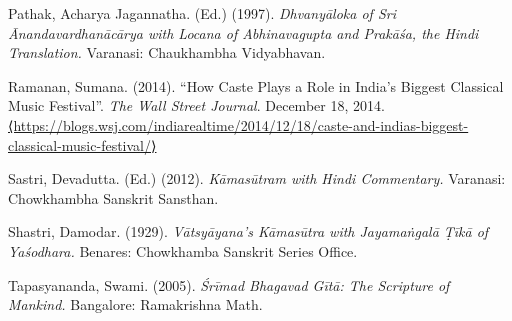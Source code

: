 \begin{thebibliography}{99}
  Pathak, Acharya Jagannatha. (Ed.) (1997). \textit{Dhvanyāloka of Sri Ānandavardhanācārya with Locana of Abhinavagupta and Prakāśa, the Hindi Translation.} Varanasi: Chaukhambha Vidyabhavan.

  Ramanan, Sumana. (2014). “How Caste Plays a Role in India’s Biggest Classical Music Festival”. \textit{The Wall Street Journal}. December 18, 2014. \url{⟨https://blogs.wsj.com/indiarealtime/2014/12/18/caste-and-indias-biggest-classical-music-festival/⟩}

  Sastri, Devadutta. (Ed.) (2012). \textit{Kāmasūtram with Hindi Commentary.} Varanasi: Chowkhambha Sanskrit Sansthan.

  Shastri, Damodar. (1929). \textit{Vātsyāyana’s Kāmasūtra with Jayamaṅgalā Ṭīkā of Yaśodhara.} Benares: Chowkhamba Sanskrit Series Office.

  Tapasyananda, Swami. (2005). \textit{Śrīmad Bhagavad Gītā: The Scripture of Mankind.} Bangalore: Ramakrishna Math.

 \end{thebibliography}

\theendnotes

